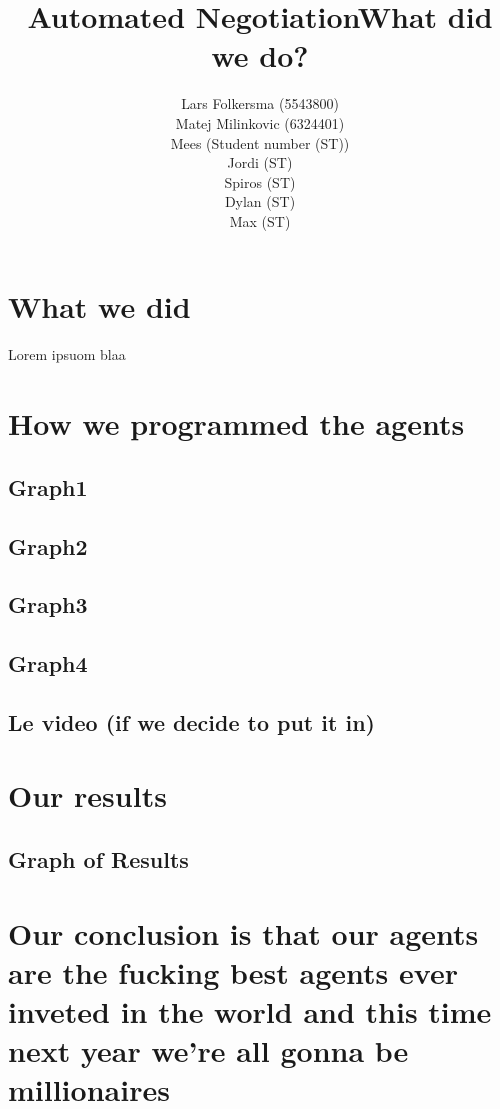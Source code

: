 \documentclass[10pt,a4paper]{article}
\begin{document}
\title{Automated Negotiation}
\author{Lars Folkersma (5543800)\\Matej Milinkovic (6324401)\\ Mees (Student number (ST))\\Jordi (ST)\\ Spiros (ST)\\Dylan (ST)\\Max (ST)}

\newpage

\section{What we did}
\title{What did we do?}
Lorem ipsuom blaa



\section{How we programmed the agents}
\subsection{Graph1}

\subsection{Graph2}

\subsection{Graph3}

\subsection{Graph4}

\subsection{Le video (if we decide to put it in)}


\section{Our results}

\subsection{Graph of Results}

\section{Our conclusion is that our agents are the fucking best agents ever inveted in the world and this time next year we're all gonna be millionaires}
\end{document}
